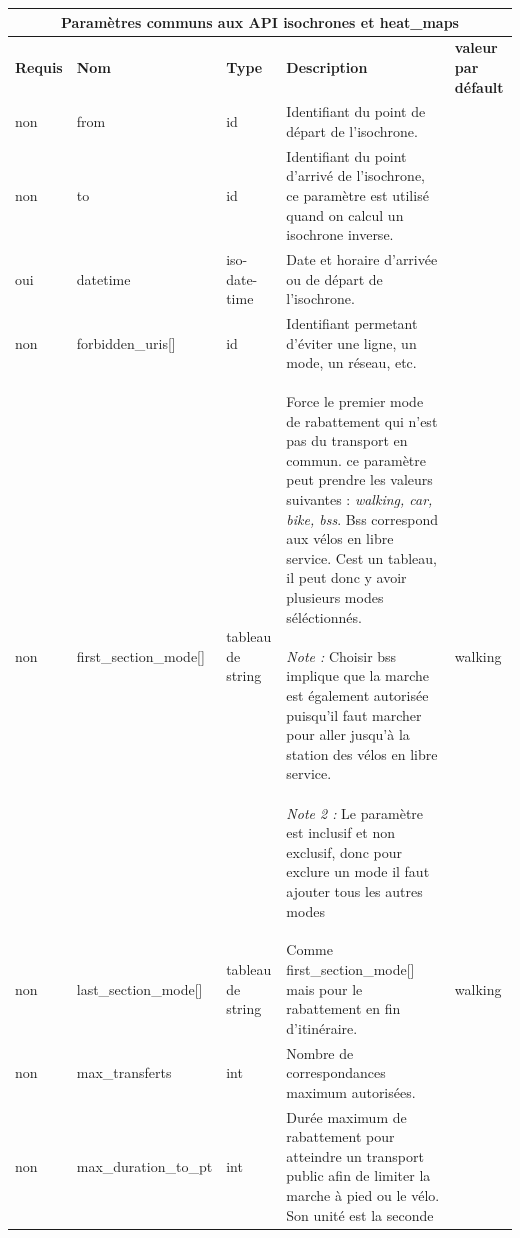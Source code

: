 \documentclass[a4paper]{report}
\begin{document}
\begin{center}
	\begin{tabular}{|l|l|p{1.5cm}|p{6cm}|l|}
	\hline
	\multicolumn{5}{|c|}{\cellcolor{LightCyan} \textbf{Paramètres communs aux API isochrones et heat\_maps}} \\
	\hline
	\textbf{Requis} & \textbf{Nom} & \textbf{Type} & \textbf{Description} &  \textbf{valeur par défault} \\
	\hline
	non & from & id & Identifiant du point de départ de l'isochrone. &\\
	\hline
	non & to & id & Identifiant du point d'arrivé de l'isochrone, ce paramètre est utilisé quand on calcul un isochrone inverse. &\\
	\hline
	oui & datetime & iso-date-time & Date et horaire d'arrivée ou de départ de l'isochrone. & \\
	\hline
	non & forbidden\_uris[] & id & Identifiant permetant d'éviter une ligne, un mode, un réseau, etc. & \\
	\hline
	non & first\_section\_mode[] & tableau de string & Force le premier mode de rabattement qui n'est pas du transport en commun.  ce paramètre peut prendre les valeurs suivantes : \emph{walking, car, bike, bss}. Bss correspond aux vélos en libre service. Cest un tableau, il peut donc y avoir plusieurs modes séléctionnés.
	\paragraph{}\emph{Note :} Choisir bss implique que la marche est également autorisée puisqu'il faut marcher pour aller jusqu'à la station des vélos en libre service.
	\paragraph{}\emph{Note 2 :} Le paramètre est inclusif et non exclusif, donc pour exclure un mode il faut ajouter tous les autres modes & walking \\ 
	\hline
	non & last\_section\_mode[] & tableau de string & Comme first\_section\_mode[] mais pour le rabattement en fin d'itinéraire. & walking \\ 
	\hline
	non & max\_transferts & int & Nombre de correspondances maximum autorisées. & \\
	\hline
	non & max\_duration\_to\_pt & int & Durée maximum de rabattement pour atteindre un transport public afin de limiter la marche à pied ou le vélo. Son unité est la seconde

\end{tabular}
\end{center}
\end{document}
